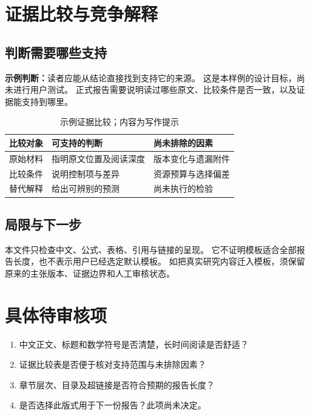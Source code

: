 \section{证据比较与竞争解释}
\subsection{判断需要哪些支持}
\textbf{示例判断：}读者应能从结论直接找到支持它的来源。
这是本样例的设计目标，尚未进行用户测试。
正式报告需要说明读过哪些原文、比较条件是否一致，以及证据能支持到哪里。

\begin{table}[htbp]
\centering
\caption{示例证据比较；内容为写作提示}
\begin{tabular}{p{.20\linewidth}p{.32\linewidth}p{.32\linewidth}}
\toprule
比较对象 & 可支持的判断 & 尚未排除的因素\\
\midrule
原始材料 & 指明原文位置及阅读深度 & 版本变化与遗漏附件\\
比较条件 & 说明控制项与差异 & 资源预算与选择偏差\\
替代解释 & 给出可辨别的预测 & 尚未执行的检验\\
\bottomrule
\end{tabular}
\end{table}

\subsection{局限与下一步}
本文件只检查中文、公式、表格、引用与链接的呈现。
它不证明模板适合全部报告长度，也不表示用户已经选定默认模板。
如把真实研究内容迁入模板，须保留原来的主张版本、证据边界和人工审核状态。

\section{具体待审核项}
\begin{enumerate}
\item 中文正文、标题和数学符号是否清楚，长时间阅读是否舒适？
\item 证据比较表是否便于核对支持范围与未排除因素？
\item 章节层次、目录及超链接是否符合预期的报告长度？
\item 是否选择此版式用于下一份报告？此项尚未决定。
\end{enumerate}
